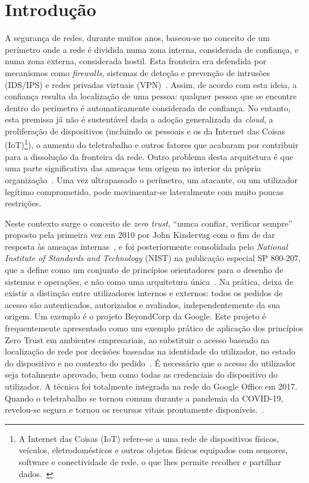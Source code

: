 \documentclass{llncs}
\begin{document}
\section{Introdução}
A segurança de redes, durante muitos anos, baseou-se no conceito de um perímetro onde a rede 
é dividida numa zona interna, considerada de confiança, e numa zona externa, considerada hostil. Esta fronteira era defendida por mecanismos como
\textit{firewalls}, sistemas de deteção e prevenção de intrusões (IDS/IPS) e redes
privadas virtuais (VPN)~\cite{kang2023}. Assim, de acordo com esta ideia, a confiança 
resulta da localização de uma pessoa: qualquer pessoa que se encontre dentro do perímetro é 
automaticamente considerada de confiança. No entanto, esta premissa já não é sustentável dada a adoção generalizada da \textit{cloud}, a proliferação de
dispositivos (incluindo os pessoais e os da Internet das Coisas (IoT)\footnote{A Internet das Coisas (IoT) refere-se a uma rede de dispositivos físicos, 
veículos, eletrodomésticos e outros objetos físicos equipados com sensores, software e conectividade de rede, o que lhes permite recolher e partilhar dados.~\cite{ibm_iot}}), 
o aumento do teletrabalho e outros fatores que acabaram por contribuir para a dissolução da fronteira da rede. Outro problema desta arquitetura é 
que uma parte significativa das ameaças tem origem no interior da própria organização~\cite{kang2023}. Uma vez ultrapassado o perímetro, 
um atacante, ou um utilizador legítimo comprometido, pode movimentar-se lateralmente com muito poucas restrições.

Neste contexto surge o conceito de \textit{zero trust}, ``nunca confiar, verificar sempre'' proposto pela primeira vez em 2010 por John Kindervag
com o fim de dar resposta às ameaças internas~\cite{kindervag2010}, e foi posteriormente consolidada pelo \textit{National Institute of Standards and Technology} (NIST) na publicação especial 
SP 800-207, que a define como um conjunto de princípios orientadores para o desenho de sistemas e operações, e não como uma arquitetura 
única~\cite{rose2020}. Na prática, deixa de existir a
distinção entre utilizadores internos e externos: todos os pedidos de acesso são
autenticados, autorizados e avaliados, independentemente da sua origem. Um exemplo
é o projeto BeyondCorp da Google. Este projeto é frequentemente apresentado como um exemplo prático de aplicação dos princípios Zero Trust em ambientes empresariais, ao substituir o acesso baseado na localização de rede por decisões baseadas na identidade do utilizador, no estado do dispositivo e no contexto do pedido~\cite{ward2014}. É necessário que o acesso do utilizador seja totalmente aprovado, bem como todas as credenciais do dispositivo do utilizador. A técnica foi totalmente integrada na rede do Google Office em 2017. Quando o teletrabalho se tornou 
comum durante a pandemia da COVID-19, revelou-se segura e tornou os recursos vitais prontamente disponíveis.~\cite{kang2023}.
\end{document}
